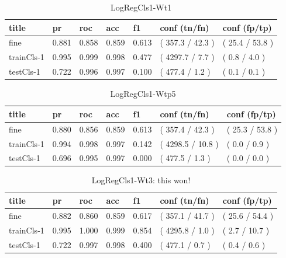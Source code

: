 \documentclass[ms]{nuthesis}
\begin{document}
\FloatBarrier
\begin{table}[H]
\centering
\begin{tabular}{|l||l||l||l||l||l||l|}\toprule
title & pr & roc & acc & f1 & conf (tn/fn) & conf (fp/tp) \\ \midrule
fine & 0.881 & 0.858 & 0.859 & 0.613 & ( 357.3 / 42.3 ) & ( 25.4 / 53.8 ) \\
trainCls-1 & 0.995 & 0.999 & 0.998 & 0.477 & ( 4297.7 / 7.7 ) & ( 0.8 / 4.0 ) \\
testCls-1 & 0.722 & 0.996 & 0.997 & 0.100 & ( 477.4 / 1.2 ) & ( 0.1 / 0.1 ) \\ \bottomrule
\end{tabular}
\caption{LogRegCls1-Wt1}
\label{tab:LogRegCls1-Wt1}
\end{table}
\FloatBarrier


\FloatBarrier
\begin{table}[H]
\centering
\begin{tabular}{|l||l||l||l||l||l||l|}\toprule
title & pr & roc & acc & f1 & conf (tn/fn) & conf (fp/tp) \\ \midrule
fine & 0.880 & 0.856 & 0.859 & 0.613 & ( 357.4 / 42.3 ) & ( 25.3 / 53.8 ) \\
trainCls-1 & 0.994 & 0.998 & 0.997 & 0.142 & ( 4298.5 / 10.8 ) & ( 0.0 / 0.9 ) \\
testCls-1 & 0.696 & 0.995 & 0.997 & 0.000 & ( 477.5 / 1.3 ) & ( 0.0 / 0.0 ) \\ \bottomrule
\end{tabular}
\caption{LogRegCls1-Wtp5}
\label{tab:LogRegCls1-Wtp5}
\end{table}
\FloatBarrier

\FloatBarrier
\begin{table}[H]
\centering
\begin{tabular}{|l||l||l||l||l||l||l|}\toprule
title & pr & roc & acc & f1 & conf (tn/fn) & conf (fp/tp) \\ \midrule
fine & 0.882 & 0.860 & 0.859 & 0.617 & ( 357.1 / 41.7 ) & ( 25.6 / 54.4 ) \\
trainCls-1 & 0.995 & 1.000 & 0.999 & 0.854 & ( 4295.8 / 1.0 ) & ( 2.7 / 10.7 ) \\
testCls-1 & 0.722 & 0.997 & 0.998 & 0.400 & ( 477.1 / 0.7 ) & ( 0.4 / 0.6 ) \\ \bottomrule
\end{tabular}
\caption{LogRegCls1-Wt3: this won!}
\label{tab:LogRegCls1-Wt3}
\end{table}
\FloatBarrier
\end{document}

